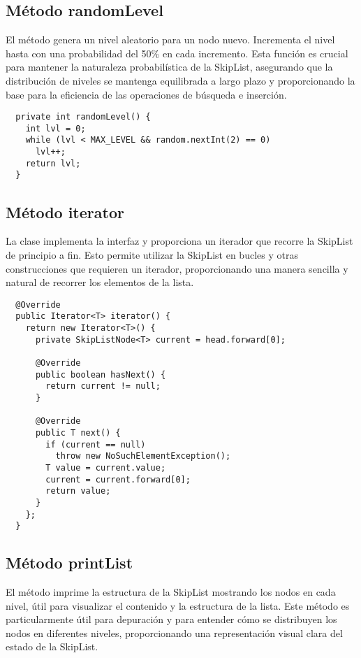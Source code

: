 \subsection{Método randomLevel}

El método  genera un nivel aleatorio para un nodo nuevo. Incrementa el nivel hasta  con una probabilidad del 50\% en cada incremento. Esta función es crucial para mantener la naturaleza probabilística de la SkipList, asegurando que la distribución de niveles se mantenga equilibrada a largo plazo y proporcionando la base para la eficiencia de las operaciones de búsqueda e inserción.

\begin{verbatim}
  private int randomLevel() {
    int lvl = 0;
    while (lvl < MAX_LEVEL && random.nextInt(2) == 0)
      lvl++;
    return lvl;
  }
\end{verbatim}

\subsection{Método iterator}

La clase implementa la interfaz  y proporciona un iterador que recorre la SkipList de principio a fin. Esto permite utilizar la SkipList en bucles  y otras construcciones que requieren un iterador, proporcionando una manera sencilla y natural de recorrer los elementos de la lista.

\begin{verbatim}
  @Override
  public Iterator<T> iterator() {
    return new Iterator<T>() {
      private SkipListNode<T> current = head.forward[0];

      @Override
      public boolean hasNext() {
        return current != null;
      }

      @Override
      public T next() {
        if (current == null)
          throw new NoSuchElementException();
        T value = current.value;
        current = current.forward[0];
        return value;
      }
    };
  }
\end{verbatim}

\subsection{Método printList}

El método  imprime la estructura de la SkipList mostrando los nodos en cada nivel, útil para visualizar el contenido y la estructura de la lista. Este método es particularmente útil para depuración y para entender cómo se distribuyen los nodos en diferentes niveles, proporcionando una representación visual clara del estado de la SkipList.


